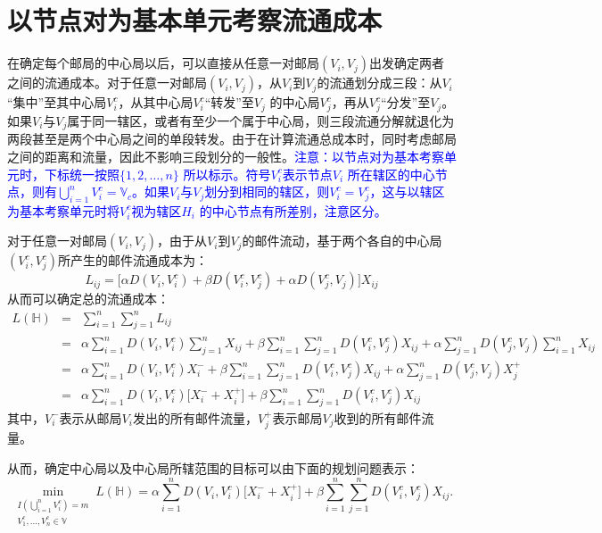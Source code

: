 \section{以节点对为基本单元考察流通成本}
在确定每个邮局的中心局以后，可以直接从任意一对邮局$(V_i,V_j)$出发确定两者之间的流通成本。对于任意一对邮局$(V_i,V_j)$，从$V_i$到$V_j$的流通划分成三段：从$V_i$“集中”至其中心局$V_i^c$，从其中心局$V_i^c$“转发”至$V_j$ 的中心局$V_j^c$，再从$V_j^c$“分发”至$V_j$。如果$V_i$与$V_j$属于同一辖区，或者有至少一个属于中心局，则三段流通分解就退化为两段甚至是两个中心局之间的单段转发。由于在计算流通总成本时，同时考虑邮局之间的距离和流量，因此不影响三段划分的一般性。\textcolor{blue}{注意：以节点对为基本考察单元时，下标统一按照$\{1,2,\ldots,n\}$ 所以标示。符号$V_i^c$表示节点$V_i$ 所在辖区的中心节点，则有$\bigcup\limits_{i=1}^n V_i^c = \mathbb V_c$。如果$V_i$与$V_j$划分到相同的辖区，则$V_i^c=V_j^c$，这与以辖区为基本考察单元时将$V_i^c$视为辖区$H_i$ 的中心节点有所差别，注意区分。}

对于任意一对邮局$(V_i,V_j)$，由于从$V_i$到$V_j$的邮件流动，基于两个各自的中心局$(V_i^c,V_j^c)$所产生的邮件流通成本为：
\begin{equation}
    L_{ij} = \big[\alpha D(V_i, V_i^c) + \beta D(V_i^c, V_j^c) + \alpha D(V_j^c, V_j) \big] X_{ij}
\end{equation}
从而可以确定总的流通成本：
\begin{equation}
    \begin{array}{lll}
        L(\mathbb H) & = & \sum\limits_{i=1}^n\sum\limits_{j=1}^n L_{ij}\\
        & = & \alpha \sum\limits_{i=1}^n D(V_i, V_i^c) \sum\limits_{j=1}^n X_{ij} + \beta \sum\limits_{i=1}^n\sum\limits_{j=1}^n D(V_i^c,V_j^c) X_{ij} + \alpha \sum\limits_{j=1}^n D(V_j^c, V_j) \sum\limits_{i=1}^n X_{ij} \\
        & = & \alpha \sum\limits_{i=1}^n D(V_i, V_i^c) X_i^{-} + \beta \sum\limits_{i=1}^n\sum\limits_{j=1}^n D(V_i^c,V_j^c) X_{ij} + \alpha \sum\limits_{j=1}^n D(V_j^c, V_j) X_j^{+} \\
        & = & \alpha \sum\limits_{i=1}^n D(V_i,V_i^c) \big[X_i^{-} + X_i^{+}\big] + \beta \sum\limits_{i=1}^n\sum\limits_{j=1}^n D(V_i^c,V_j^c) X_{ij}
    \end{array}
\end{equation}
其中，$V_i^{-}$表示从邮局$V_i$发出的所有邮件流量，$V_j^{+}$表示邮局$V_j$收到的所有邮件流量。

从而，确定中心局以及中心局所辖范围的目标可以由下面的规划问题表示：
\begin{equation}
    \min\limits_{\substack{I(\bigcup\limits_{i=1}^n V_i^c)= m\\V_1^c,\ldots,V_n^c\in \mathbb V}} L(\mathbb H) = \alpha \sum\limits_{i=1}^n D(V_i,V_i^c) \big[X_i^{-} + X_i^{+}\big] + \beta \sum\limits_{i=1}^n\sum\limits_{j=1}^n D(V_i^c,V_j^c) X_{ij}.
\end{equation}


